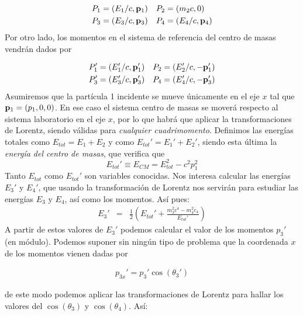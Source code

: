 \begin{eqnarray}
	P_1 = (E_1/c,\mathbf{p}_1) & \quad P_2 = (m_2c,0) \\
	P_3 = (E_3/c,\mathbf{p}_3) & \quad P_4 = (E_4/c,\mathbf{p}_4)
\end{eqnarray}
Por otro lado, los momentos en el sistema de referencia del centro de masas vendrán dados por

\begin{eqnarray}
	P_1' = (E_1'/c,\mathbf{p}_1') \quad P_2 = (E_2'/c,-\mathbf{p}_1') \\
	P_3' = (E_3'/c,\mathbf{p}_3') \quad P_4 = (E_4'/c,-\mathbf{p}_3')
\end{eqnarray}
Asumiremos que la partícula 1 incidente se mueve únicamente en el eje $x$ tal que $\mathbf{p}_1=(p_1,0,0)$. En ese caso el sistema centro de masas se moverá respecto al sistema laboratorio en el eje $x$, por lo que habrá que aplicar la transformaciones de Lorentz, siendo válidas para \textit{cualquier cuadrimomento}. Definimos las energías totales como $E_{tot}=E_1+E_2$ y como  $E_{tot}'=E_1'+E_2'$, siendo esta última la \textit{energía del centro de masas}, que verifica que
\begin{equation}
	E_{tot}' \equiv E_{CM} = E_{tot}^2 - c^2p_1^2 \label{Ec:18}
\end{equation}
Tanto $E_{tot}$ como $E_{tot}'$ son variables conocidas. Nos interesa calcular las energías $E_3'$ y $E_4'$, que usando la transformación de Lorentz nos servirán para estudiar las energías $E_3$ y $E_4$, así como los momentos.  Así pues:
\begin{eqnarray}
	E_3 ' & = & \frac{1}{2} \left( E_{tot}' + \frac{m_3^2c^4- m_4^2c_4}{E_{tot}'} \right) 
\end{eqnarray}
A partir de estos valores de $E_3'$ podemos calcular el valor de los momentos $p_3'$  (en módulo). Podemos suponer sin ningún tipo de problema que la coordenada $x$ de los momentos vienen dadas por


\begin{eqnarray}
	p_{3x}' = p_3' \cos (\theta_3') 
\end{eqnarray}

de este modo podemos aplicar las transformaciones de Lorentz para hallar los valores del $\cos (\theta_3)$ y $\cos (\theta_4)$. Así:

